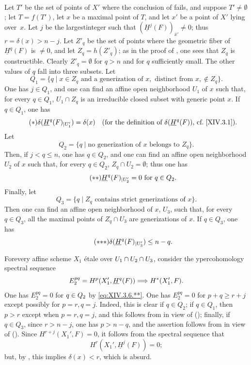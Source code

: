 Let $T'$ be the set of points of $X'$ where the conclusion of  fails, and suppose $T' \neq \emptyset$; let $T=f(T')$, let $x$ be a maximal point of $T$, and let $x'$ be a point of $X'$ lying over~$x$. Let $j$ be the largest\pageoriginale integer such that $(\underline{H}^j(F))_{\bar{x}'} \neq 0$; thus $r=\delta(x)>n-j$. Let $Z'_q$ be the set of points where the geometric fiber of $\underline{H}^q(F)$ is $\neq 0$, and let $Z_q =h(Z'_q)$; as in the proof of , one sees that $Z_q$ is constructible. Clearly $Z'_q=\emptyset$ for $q>n$ and for $q$ sufficiently small. The other values of $q$ fall into three subsets. Let
$$
Q_1=\{q\mid x\in Z_q\text{ and a generization of }x, \text{ distinct from }x, \not\in Z_q\}.
$$
One has $j \in Q_1$, and one can find an affine open neighborhood $U_1$ of $x$ such that, for every $q \in Q_1$, $U_1 \cap Z_q$ is an irreducible closed subset with generic point $x$. If $q \in Q_1$, one has
\begin{equation*} \label{eq:XIV.3.6.*} \tag{$*$} \delta(\sisi{\underline{H}^q(F){|U_1'}}{\underline{H}^q(F)_{|U_1'}})=\delta(x)\quad\text{(for the definition of $\delta(\underline{H}^q(F))$, \cf \Ref{XIV.3.1})}.
\end{equation*}
Let
$$
Q_2=\{q\mid\text{no generization of $x$ belongs to }Z_q\}.
$$
Then, if $j<q\leq n$, one has $q\in Q_2$, and one can find an affine open neighborhood $U_2$ of $x$ such that, for every $q \in Q_2$, $Z_q \cap U_2 = \emptyset$; thus one has
\begin{equation*} \label{eq:XIV.3.6.**} \tag{$**$} \sisi{\underline{H}^q(F){|U'_2}}{\underline{H}^q(F)_{|U'_2}}=0\text{ for }q\in Q_2.
\end{equation*}
Finally, let
$$
Q_3= \{q\mid Z_q \text{ contains strict generizations of }x\}.
$$
Then one can find an affine open neighborhood of $x$, $U_3$, such that, for every $q \in Q_3$, all the maximal points of $Z_q \cap U_3$ are generizations of $x$. If $q \in Q_3$, one has
\begin{equation*} \label{eq:XIV.3.6.***} \tag{${*}{*}{*}$} \delta(\sisi{\underline{H}^q(F){|U'_3}}{\underline{H}^q(F)_{|U'_3}})\leq n-q.
\end{equation*}

For\pageoriginale every affine scheme $X_1$ \'{e}tale over $U_1 \cap U_2 \cap \sisi{{}}{U}_3$, consider the ypercohomology spectral sequence
$$
E^{pq}_2= H^p(X_1', \underline{H}^q(F)) \To H^*(X'_1, F).
$$
One has $E^{pq}_2=0$ for $q\sisi{>}{\in Q_2}$ by \eqref{eq:XIV.3.6.**}. One has $E^{pq}_2=0$ for $p+q \geq r+j$ except possibly for $p=r, q=j$. Indeed, this is clear if $q\in Q_2$; if $q\in Q_1$, then $p>r$ except when $p=r, q=j$, and this follows from  in view of (); finally, if $q\in Q_3$, since $r>n-j$, one has $p>n-q$, and the assertion follows from  in view of (). Since $H^{r+j}(X_1', F)=0$, it follows from the spectral sequence that
$$H^r(X_1', \underline{H}^j(F))=0;$$
but, by , this implies $\delta(x)<r$, which is absurd.

